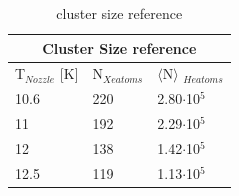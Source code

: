 \begin{table}[t]
\centering
\begin{tabular}{|l|l|l|}\hline
\multicolumn{3}{|c|}{Cluster Size reference}                                                             \\\hline
T$_{Nozzle}$ {[}K{]}  & N$_{Xe atoms}$ & $\langle$N$\rangle$ $_{He atoms}$ \\ \hline
10.6                  & 220     & 2.80$\cdot$10$^{5}$                      \\ \hline
11                    & 192     & 2.29$\cdot$10$^{5}$                       \\ \hline
12                    & 138     & 1.42$\cdot$10$^{5}$                      \\ \hline
12.5                  & 119     & 1.13$\cdot$10$^{5}$                    \\ \hline
\end{tabular}
\caption{cluster size reference}
\label{tab:clustersize}
\end{table}


%


